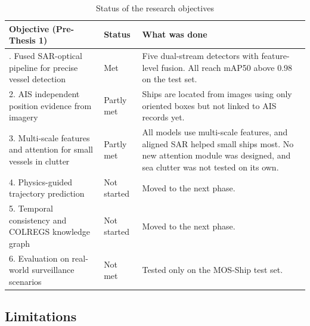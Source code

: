 \begin{table}[htbp]
\centering
\footnotesize
\renewcommand{\arraystretch}{1.5}
\setlength{\tabcolsep}{4pt}
\setlength{\tw}{\dimexpr\textwidth-6\tabcolsep-4\arrayrulewidth\relax}

\begin{tabular}{
|>{\raggedright\arraybackslash}p{0.38\tw}
|>{\centering\arraybackslash}p{0.14\tw}
|>{\raggedright\arraybackslash}p{0.48\tw}|
}
\hline
\rowcolor{gray!20}
\textbf{Objective (Pre-Thesis 1)} &
\textbf{Status} &
\textbf{What was done} \\
\hline

1. Fused SAR-optical pipeline for precise vessel detection &
Met &
Five dual-stream detectors with feature-level fusion. All reach mAP50 above 0.98 on the test set. \\
\hline

2. AIS independent position evidence from imagery &
Partly met &
Ships are located from images using only oriented boxes but not linked to AIS records yet. \\
\hline

3. Multi-scale features and attention for small vessels in clutter &
Partly met &
All models use multi-scale features, and aligned SAR helped small ships most. No new attention module was designed, and sea clutter was not tested on its own. \\
\hline

4. Physics-guided trajectory prediction &
Not started &
Moved to the next phase. \\
\hline

5. Temporal consistency and COLREGS knowledge graph &
Not started &
Moved to the next phase. \\
\hline

6. Evaluation on real-world surveillance scenarios &
Not met &
Tested only on the MOS-Ship test set. \\
\hline
\end{tabular}

\caption{Status of the research objectives}
\label{tab:research_objectives_status}
\end{table}
\subsection{Limitations}

